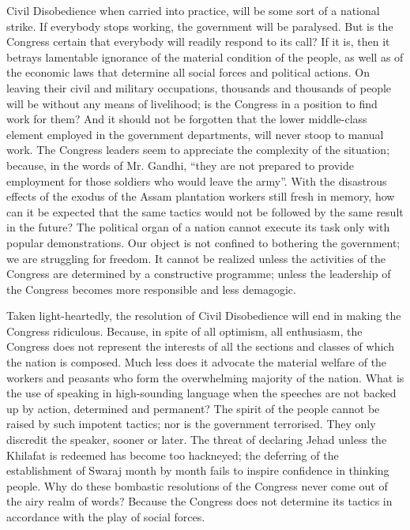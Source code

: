 Civil Disobedience when carried into practice, will be some sort of a national strike. If everybody stops working, the government will be paralysed. But is the Congress certain that everybody will readily respond to its call? If it is, then it betrays lamentable ignorance of the material condition of the people, as well as of the economic laws that determine all social forces and political actions. On leaving their civil and military occupations, thousands and thousands of people will be without any means of livelihood; is the Congress in a position to find work for them? And it should not be forgotten that the lower middle-class element employed in the government departments, will never stoop to manual work. The Congress leaders seem to appreciate the complexity of the situation; because, in the words of Mr. Gandhi, “they are not prepared to provide employment for those soldiers who would leave the army”. With the disastrous effects of the exodus of the Assam plantation workers still fresh in memory, how can it be expected that the same tactics would not be followed by the same result in the future? The political organ of a nation cannot execute its task only with popular demonstrations. Our object is not confined to bothering the government; we are struggling for freedom. It cannot be realized unless the activities of the Congress are determined by a constructive programme; unless the leadership of the Congress becomes more responsible and less demagogic. 

Taken light-heartedly, the resolution of Civil Disobedience will end in making the Congress ridiculous. Because, in spite of all optimism, all enthusiasm, the Congress does not represent the interests of all the sections and classes of which the nation is composed. Much less does it advocate the material welfare of the workers and peasants who form the overwhelming majority of the nation. What is the use of speaking in high-sounding language when the speeches are not backed up by action, determined and permanent? The spirit of the people cannot be raised by such impotent tactics; nor is the government terrorised. They only discredit the speaker, sooner or later. The threat of declaring Jehad unless the Khilafat is redeemed has become too hackneyed; the deferring of the establishment of Swaraj month by month fails to inspire confidence in thinking people. Why do these bombastic resolutions of the Congress never come out of the airy realm of words? Because the Congress does not determine its tactics in accordance with the play of social forces. 

